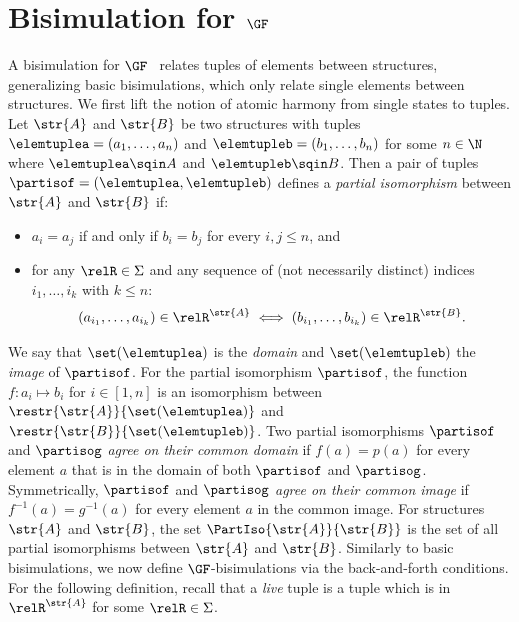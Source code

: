 \section{Bisimulation for $\GF$}
A bisimulation for $\GF$~\cite{AndrekaNB98} relates tuples of elements between structures, generalizing basic bisimulations, which only relate single elements between structures.
We first lift the notion of atomic harmony from single states to tuples.
Let $\str{A}$ and $\str{B}$ be two structures with tuples $\elemtuplea = (a_{1}, \ldots, a_{n})$ and $\elemtupleb = (b_{1}, \ldots, b_{n})$ for some $n \in \N$ where $\elemtuplea \sqin A$ and $\elemtupleb \sqin B$.
Then a pair of tuples $\partisof = (\elemtuplea, \elemtupleb)$ defines a \emph{partial isomorphism} between $\str{A}$ and $\str{B}$ if:
\begin{itemize}
  \item $a_{i} = a_{j}$ if and only if $b_{i} = b_{j}$ for every $i,j \le n$, and
  \item for any $\relR \in \Sigma$ and any sequence of (not necessarily distinct) indices $i_{1}, \ldots, i_{k}$ with $k \le n$:
    \begin{equation*}
    (a_{i_{1}}, \ldots, a_{i_{k}}) \in \relR^{\str{A}} \iff (b_{i_{1}}, \ldots, b_{i_{k}}) \in \relR^{\str{B}}\mathrm{.}
    \end{equation*}
\end{itemize}
We say that $\set(\elemtuplea)$ is the \emph{domain} and $\set(\elemtupleb)$ the \emph{image} of $\partisof$.
For the partial isomorphism $\partisof$, the function $f \colon a_{i} \mapsto b_{i}$ for $i \in [1,n]$ is an isomorphism between $\restr{\str{A}}{\set(\elemtuplea)}$ and $\restr{\str{B}}{\set(\elemtupleb)}$.
Two partial isomorphisms $\partisof$ and $\partisog$ \emph{agree on their common domain} if $f(a) = p(a)$ for every element $a$ that is in the domain of both $\partisof$ and $\partisog$.
Symmetrically, $\partisof$ and $\partisog$ \emph{agree on their common image} if $f^{-1}(a) = g^{-1}(a)$ for every element $a$ in the common image.
For structures $\str{A}$ and $\str{B}$, the set $\PartIso{\str{A}}{\str{B}}$ is the set of all partial isomorphisms between $\str{A}$ and $\str{B}$. Similarly to basic bisimulations, we now define $\GF$-bisimulations via the back-and-forth conditions. For the following definition, recall that a \emph{live} tuple is a tuple which is in $\relR^{\str{A}}$ for some $\relR \in \Sigma$.
